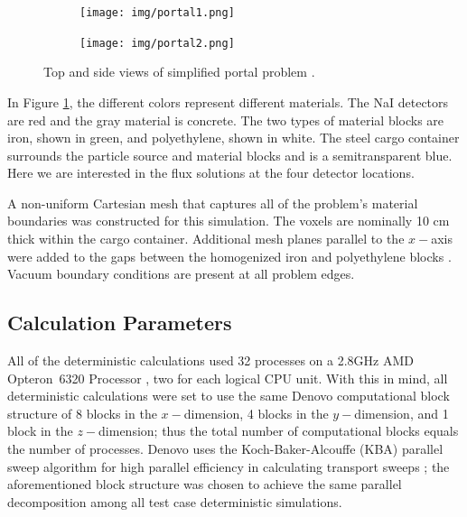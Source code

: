 \documentclass{article} %
\begin{document}
\begin{figure}[!htb]
\centering
\begin{subfigure}{0.475\textwidth}
\texttt{[image: img/portal1.png]}
\end{subfigure}
\begin{subfigure}{0.475\textwidth}
\texttt{[image: img/portal2.png]}
\end{subfigure}
\caption{Top and side views of simplified portal problem \cite{advantg}.}
\label{p1}
\end{figure}

In Figure \ref{p1}, the different colors represent different materials. The NaI
detectors are red and the gray material is concrete. The two types of material
blocks are iron, shown in green, and polyethylene, shown in white. The steel
cargo container surrounds the particle source and material blocks and is a
semitransparent blue. Here we are interested in the flux solutions at the four
detector locations.

A non-uniform Cartesian mesh that captures all of the problem's material
boundaries was constructed for this simulation. The voxels are nominally 10 cm
thick within the cargo container. Additional mesh planes parallel to the
$x-$axis were added to the gaps between the homogenized iron and polyethylene
blocks \cite{advantg}. Vacuum boundary conditions are present at all problem
edges.

\subsection{Calculation Parameters}

All of the deterministic calculations used 32 processes on a 2.8GHz AMD 
Opteron\texttrademark\ 6320 Processor \cite{amd}, two for each logical CPU
unit. With this in mind, all deterministic calculations were set to use the
same Denovo computational block structure of 8 blocks 
in the $x-$dimension, 4 blocks in the $y-$dimension, and 1 block in the 
$z-$dimension; thus the total number of computational blocks equals the number
of processes. Denovo uses the Koch-Baker-Alcouffe (KBA) parallel sweep
algorithm for high parallel efficiency in calculating transport sweeps
\cite{denovo}; the aforementioned block structure was chosen to achieve the
same parallel decomposition among all test case deterministic simulations. 
\end{document}
